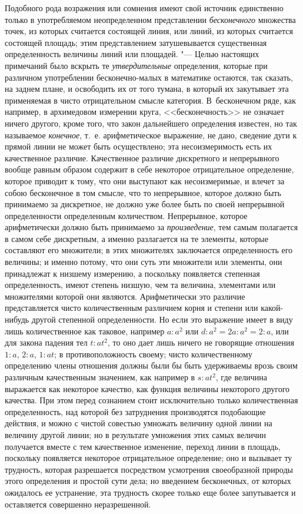 Подобного рода возражения или сомнения имеют свой источник единственно
только в употребляемом неопределенном представлении
{\em бесконечного} множества точек, из которых
считается состоящей линия, или линий, из которых считается состоящей
площадь; этим представлением затушевывается существенная определенность
величины линий или площадей. "--- Целью настоящих примечаний было вскрыть те
{\em утвердительные} определения, которые при различном
употреблении бесконечно-малых в математике остаются, так сказать, на заднем
плане, и освободить их от того тумана, в который их закутывает эта
применяемая в чисто отрицательном смысле категория. В~бесконечном ряде, как
например, в архимедовом измерении круга, <<бесконечность>> не означает ничего
другого, кроме того, что закон дальнейшего определения известен, но так
называемое {\em конечное}, т.~е. арифметическое
выражение, не дано, сведение дуги к прямой линии не может быть
осуществлено; эта несоизмеримость есть их качественное различие.
Качественное различие дискретного и непрерывного вообще равным образом
содержит в себе некоторое отрицательное определение, которое приводит к
тому, что они выступают как несоизмеримые, и влечет за собою бесконечное в
том смысле, что то непрерывное, которое должно быть принимаемо за
дискретное, не должно уже более быть по своей непрерывной определенности
определенным количеством. Непрерывное, которое арифметически должно быть
принимаемо за {\em произведение}, тем самым полагается
в самом себе дискретным, а именно разлагается на те элементы, которые
составляют его множители; в этих множителях заключается определенность его
величины; и именно потому, что они суть эти множители или элементы, они
принадлежат к низшему измерению, а поскольку появляется степенная
определенность, имеют степень низшую, чем та величина, элементами или
множителями которой они являются. Арифметически это различие представляется
чисто количественным различием корня и степени или какой-нибудь другой
степенной определенности. Но если это выражение имеет в виду лишь
количественное как таковое, например $a : a^2$ или
$d : a^2 = 2a : a^2 = 2 : a$, или для закона падения тел
$t : at^2$, то оно дает лишь ничего не говорящие отношения
$1 : a$, $2:a$, $1 : at$; в противоположность своему; чисто
количественному определению члены отношения должны были бы быть удерживаемы
врозь своим различным качественным значением, как например в
$s : at^2$, где величина выражается как некоторое качество,
как функция величины некоторого другого качества. При этом перед сознанием
стоит исключительно только количественная определенность, над которой без
затруднения производятся подобающие действия, и можно с чистой совестью
умножать величину одной линии на величину другой линии; но в результате
умножения этих самых величин получается вместе с тем качественное
изменение, переход линии в площадь, поскольку появляется некоторое
отрицательное определение; оно и вызывает ту трудность, которая разрешается
посредством усмотрения своеобразной природы этого определения и простой
сути дела; но введением бесконечных, от которых ожидалось ее устранение,
эта трудность скорее только еще более запутывается и оставляется совершенно
неразрешенной.
